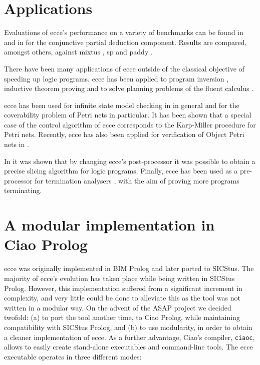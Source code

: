 \documentclass{sig-alternate}
\begin{document}

\section{Applications}

Evaluations of {\sc ecce}'s performance on a variety of benchmarks
 can be found in \cite{LeuschelMartensDeSchreye:Toplas}
 and in \cite{JorgensenLeuschelMartens:CPPD,CPD:megapaper} for
 the conjunctive partial deduction component.
Results are compared, amongst others, against
 {\sc mixtus} \cite{Sahlin93:ngc}, {\sc sp}  \cite{Gallagher91:ngc} and {\sc paddy} \cite{Prestwich:PEPM93}.

There have been many applications of {\sc ecce} outside of the classical
 objective of speeding up logic programs.
{\sc ecce} has been applied to program
 inversion \cite{GlueckLeuschel:Inversion},
 inductive theorem proving \cite{Leuschel:Lopstr03}
  and to solve
planning problems of the fluent calculus \cite{LehmannLeuschel:LPAR2000}.

{\sc ecce} has been used for
 infinite state model checking in \cite{LeuschelMassart:LOPSTR99} in general
  and for the coverability problem of Petri nets \cite{LeuschelLehmann:Coverability,LeuschelLehmann:CL2000} in particular.
It has been shown that a special case of the control algorithm of {\sc ecce} corresponds to the Karp-Miller procedure
for Petri nets.
 Recently, {\sc ecce} has also been applied for verification of
  Object Petri nets in \cite{FarwerLeuschel:PPDP04}.

In \cite{LeuschelVidal:ESOP05}
 it was shown that by changing {\sc ecce}'s post-processor it was possible
  to obtain a precise slicing algorithm for logic programs.
Finally, {\sc ecce} has been used as a pre-processor for 
 termination analysers 
  \cite{TamaryCodish:WST04}, with the aim of proving more programs terminating.

\section{A modular implementation in\\ Ciao Prolog}

{\sc ecce} was originally implemented in BIM Prolog and later ported to SICStus. The majority of {\sc ecce}'s evolution has taken place while being written in SICStus Prolog. 
However, this implementation suffered from a significant increment in complexity, and very little could be done to alleviate this as the tool was not written in a modular way. On the advent of the ASAP project we decided twofold: (a) to port the tool another time, to Ciao Prolog,
 while maintaining compatibility with SICStus Prolog, and (b) to use modularity, in order to obtain a cleaner implementation of {\sc ecce}.
As a further advantage, 
 Ciao's compiler, {\tt ciaoc}, allows to easily create stand-alone executables and command-line tools.
The {\sc ecce} executable operates in three different modes:
\end{document}

